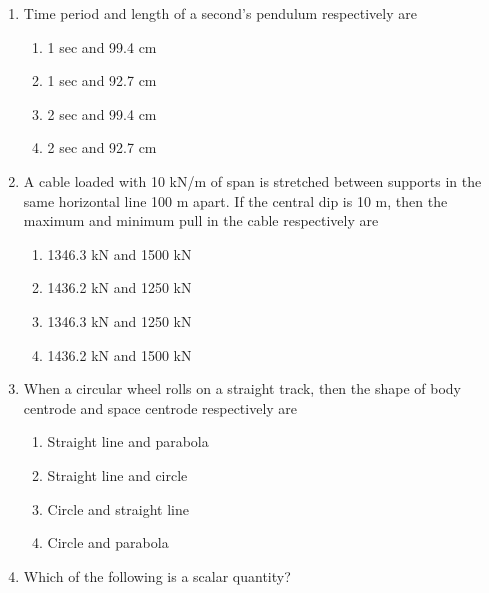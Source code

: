 \documentclass[11pt,a4paper]{article}
\begin{document}
\begin{enumerate}
\\
\item{Time period and length of a second's pendulum respectively are
}
\begin{enumerate}[label=\Alph*.]
\item{1 sec and 99.4 cm}
\item{1 sec and 92.7 cm}
\item{2 sec and 99.4 cm}
\item{2 sec and 92.7 cm}
\end{enumerate}
\item{A cable loaded with 10 kN/m of span is stretched between supports in the same horizontal line 100 m apart. If the central dip is 10 m, then the maximum and minimum pull in the cable respectively are}
\begin{enumerate}[label=\Alph*.]
\item{1346.3 kN and 1500 kN}
\item{1436.2 kN and 1250 kN}
\item{1346.3 kN and 1250 kN}
\item{1436.2 kN and 1500 kN}
\end{enumerate}
\item{When a circular wheel rolls on a straight track, then the shape of body centrode and space centrode respectively are}
\begin{enumerate}[label=\Alph*.]
\item{Straight line and parabola}
\item{Straight line and circle}
\item{Circle and straight line}
\item{Circle and parabola}
\end{enumerate}
\item{Which of the following is a scalar quantity?}
\\
\end{enumerate}
\end{document}
